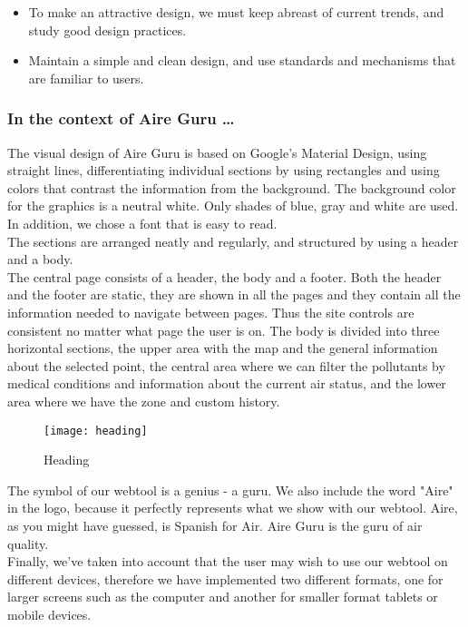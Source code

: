 \begin{itemize}
    \item To make an attractive design, we must keep abreast of current trends, and study good design practices.
    \item Maintain a simple and clean design, and use standards and mechanisms that are familiar to users.
\end{itemize}

\subsubsection*{In the context of Aire Guru \ldots}

The visual design of Aire Guru is based on Google's Material Design, using straight lines, differentiating individual sections by using rectangles
and using colors that contrast the information from the background.
The background color for the graphics is a neutral white.
Only shades of blue, gray and white are used. In addition, we chose a font that is easy to read.\\

The sections are arranged neatly and regularly, and structured by using a header and a body.\\

The central page consists of a header, the body and a footer. Both the header and the footer are static,
they are shown in all the pages and they contain all the information needed to navigate between pages. Thus the site controls are consistent no matter what page the user is on.
The body is divided into three horizontal sections, the upper area with the map and the general information about the selected point,
the central area where we can filter the pollutants by medical conditions and information about the current air status, and the
lower area where we have the zone and custom history.\\

\begin{figure}[ht]
    \centering
    \texttt{[image: heading]}
    \caption{Heading}
\end{figure}
 
The symbol of our webtool is a genius - a guru. We also include the word "Aire" in the logo, because it perfectly represents 
what we show with our webtool. Aire, as you might have guessed, is Spanish for Air. Aire Guru is the guru of air quality. \\

Finally, we've taken into account that the user may wish to use our webtool on different devices, therefore we have implemented
two different formats, one for larger screens such as the computer and another for smaller format tablets or mobile devices.